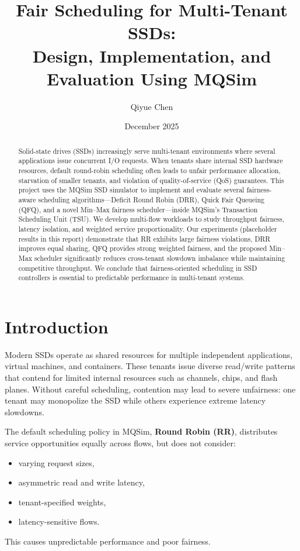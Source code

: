 \documentclass[11pt]{article}
\title{\textbf{Fair Scheduling for Multi-Tenant SSDs: \\ Design, Implementation, and Evaluation Using MQSim}}
\author{Qiyue Chen}
\date{December 2025}
\begin{document}
\maketitle

\begin{abstract}
Solid-state drives (SSDs) increasingly serve multi-tenant environments where 
several applications issue concurrent I/O requests. When tenants share internal
SSD hardware resources, default round-robin scheduling often leads to unfair
performance allocation, starvation of smaller tenants, and violation of quality-of-service (QoS) guarantees.
This project uses the MQSim SSD simulator to implement and evaluate several 
fairness-aware scheduling algorithms—Deficit Round Robin (DRR), Quick Fair 
Queueing (QFQ), and a novel Min--Max fairness scheduler—inside MQSim's 
Transaction Scheduling Unit (TSU). We develop multi-flow workloads to study 
throughput fairness, latency isolation, and weighted service proportionality.
Our experiments (placeholder results in this report) demonstrate that RR 
exhibits large fairness violations, DRR improves equal sharing, QFQ provides 
strong weighted fairness, and the proposed Min--Max scheduler significantly 
reduces cross-tenant slowdown imbalance while maintaining competitive throughput. 
We conclude that fairness-oriented scheduling in SSD controllers is essential 
to predictable performance in multi-tenant systems.
\end{abstract}

\section{Introduction}

Modern SSDs operate as shared resources for multiple independent applications,
virtual machines, and containers. These tenants issue diverse read/write
patterns that contend for limited internal resources such as channels, chips,
and flash planes. Without careful scheduling, contention may lead to severe 
unfairness: one tenant may monopolize the SSD while others experience extreme 
latency slowdowns.

The default scheduling policy in MQSim, \textbf{Round Robin (RR)}, distributes
service opportunities equally across flows, but does not consider:
\begin{itemize}
    \item varying request sizes,
    \item asymmetric read and write latency,
    \item tenant-specified weights,
    \item latency-sensitive flows.
\end{itemize}
This causes unpredictable performance and poor fairness.
\end{document}
